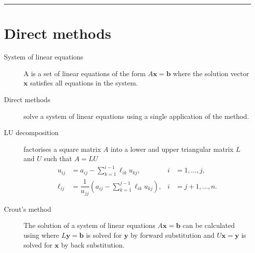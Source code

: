 \documentclass[letterpaper,10pt,english]{jupyterBook}
\begin{document}
\bigskip\hrule\bigskip



\section{Direct methods}
\label{\detokenize{8_Appendices/8.0_Cheat_sheet:direct-methods}}\begin{description}
\item[{System of linear equations\label{\detokenize{8_Appendices/8.0_Cheat_sheet:term-System-of-linear-equations}}}] \leavevmode
\sphinxAtStartPar
A {\hyperref[\detokenize{6_Direct_methods/6.0_Direct_methods:systems-of-linear-equations-section}]{}} is a set of linear equations of the form \(A \mathbf{x} = \mathbf{b}\) where the solution vector \(\mathbf{x}\) satisfies all equations in the system.

\item[{Direct methods\label{\detokenize{8_Appendices/8.0_Cheat_sheet:term-Direct-methods}}}] \leavevmode
\sphinxAtStartPar
{\hyperref[\detokenize{6_Direct_methods/6.0_Direct_methods:direct-methods-chapter}]{}} solve a system of linear equations using a single application of the method.

\item[{LU decomposition\label{\detokenize{8_Appendices/8.0_Cheat_sheet:term-LU-decomposition}}}] \leavevmode
\sphinxAtStartPar
{\hyperref[\detokenize{6_Direct_methods/6.1_LU_decomposition:lu-section}]{}} factorises a square matrix \(A\) into a lower and upper triangular matrix \(L\) and \(U\) such that \(A = LU\)
\begin{align*}
    u_{ij} &= a_{ij} - \sum_{k=1}^{i-1} \ell_{ik}u_{kj}, & i &= 1, \ldots, j, \\
    \ell_{ij} &= \dfrac{1}{u_{jj}} \left(a_{ij} - \displaystyle \sum_{k=1}^{j-1} \ell_{ik}u_{kj}\right), & i &= j+1, \ldots, n.
\end{align*}
\item[{Crout’s method\label{\detokenize{8_Appendices/8.0_Cheat_sheet:term-Crout-s-method}}}] \leavevmode
\sphinxAtStartPar
The solution of a system of linear equations \(A \mathbf{x} = \mathbf{b}\) can be calculated using {\hyperref[\detokenize{6_Direct_methods/6.1_LU_decomposition:crouts-method-section}]{}} where \(L \mathbf{y} = \mathbf{b}\) is solved for \(\mathbf{y}\) by forward substitution and \(U \mathbf{x} = \mathbf{y}\) is solved for \(\mathbf{x}\) by back substitution.


\end{description}
\end{document}
